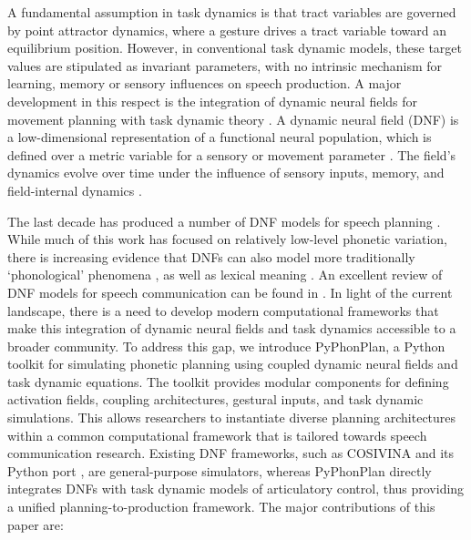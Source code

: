 \documentclass[cameraready]{Interspeech}
\begin{document}
A fundamental assumption in task dynamics is that tract variables are governed by point attractor dynamics, where a gesture drives a tract variable toward an equilibrium position. However, in conventional task dynamic models, these target values are stipulated as invariant parameters, with no intrinsic mechanism for learning, memory or sensory influences on speech production. A major development in this respect is the integration of dynamic neural fields for movement planning with task dynamic theory \cite{kirov-gafos2007, tilsen2007}. A dynamic neural field (DNF) is a low-dimensional representation of a functional neural population, which is defined over a metric variable for a sensory or movement parameter \cite{erlhagen-schoener2002, schoener-etal2016}. The field's dynamics evolve over time under the influence of sensory inputs, memory, and field-internal dynamics \cite{schneegans-etal2016, simmering-spencer2008}.

The last decade has produced a number of DNF models for speech planning \cite{kirov-gafos2007, tilsen2007, roon-gafos2016, iskarous2016, tilsen2019, harper2021, shaw-tang2023, stern-shaw2023, kirkham-strycharczuk2024, kirkham-etal2025, chaturvedi-shaw2025}. While much of this work has focused on relatively low-level phonetic variation, there is increasing evidence that DNFs can also model more traditionally `phonological' phenomena \cite{shaw2025}, as well as lexical meaning \cite{stern-pinango2026}. An excellent review of DNF models for speech communication can be found in \cite{stern2025}. In light of the current landscape, there is a need to develop modern computational frameworks that make this integration of dynamic neural fields and task dynamics accessible to a broader community. To address this gap, we introduce PyPhonPlan, a Python toolkit for simulating phonetic planning using coupled dynamic neural fields and task dynamic equations. The toolkit provides modular components for defining activation fields, coupling architectures, gestural inputs, and task dynamic simulations. This allows researchers to instantiate diverse planning architectures within a common computational framework that is tailored towards speech communication research. Existing DNF frameworks, such as COSIVINA \cite{schoener-etal2016} and its Python port \cite{schneegans2021}, are general-purpose simulators, whereas PyPhonPlan directly integrates DNFs with task dynamic models of articulatory control, thus providing a unified planning-to-production framework. The major contributions of this paper are:
\end{document}
